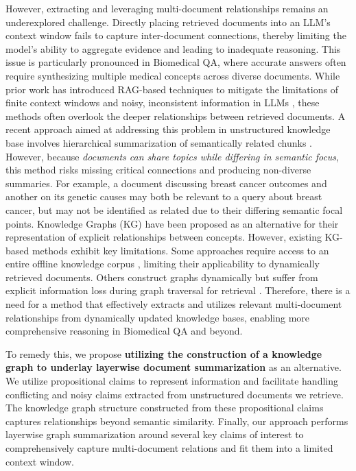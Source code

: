 \documentclass[11pt]{article}
\theoremstyle{definition}
\begin{document}
However, extracting and leveraging multi-document relationships remains an underexplored challenge. Directly placing retrieved documents into an LLM’s context window fails to capture inter-document connections, thereby limiting the model's ability to aggregate evidence and leading to inadequate reasoning. This issue is particularly pronounced in Biomedical QA, where accurate answers often require synthesizing multiple medical concepts across diverse documents. While prior work has introduced RAG-based techniques to mitigate the limitations of finite context windows and noisy, inconsistent information in LLMs \cite{DBLP:journals/corr/abs-2312-10997}, these methods often overlook the deeper relationships between retrieved documents. A recent approach aimed at addressing this problem in unstructured knowledge base involves hierarchical summarization of semantically related chunks \cite{DBLP:conf/iclr/SarthiATKGM24}. However, because \emph{documents can share topics while differing in semantic focus}, this method risks missing critical connections and producing non-diverse summaries. For example, a document discussing breast cancer outcomes and another on its genetic causes may both be relevant to a query about breast cancer, but may not be identified as related due to their differing semantic focal points. Knowledge Graphs (KG) have been proposed as an alternative for their representation of explicit relationships between concepts. However, existing KG-based methods exhibit key limitations. Some approaches require access to an entire offline knowledge corpus \cite{DBLP:journals/corr/abs-2404-16130}, limiting their applicability to dynamically retrieved documents. Others construct graphs dynamically but suffer from explicit information loss during graph traversal for retrieval \cite{DBLP:conf/aaai/0160LRSZD24}. Therefore, there is a need for a method that effectively extracts and utilizes relevant multi-document relationships from dynamically updated knowledge bases, enabling more comprehensive reasoning in Biomedical QA and beyond. 

To remedy this, we propose \textbf{utilizing the construction of a knowledge graph to underlay layerwise document summarization} as an alternative. We utilize propositional claims to represent information and facilitate handling conflicting and noisy claims extracted from unstructured documents we retrieve. The knowledge graph structure constructed from these propositional claims captures relationships beyond semantic similarity. Finally, our approach performs layerwise graph summarization around several key claims of interest to comprehensively capture multi-document relations and fit them into a limited context window.
\end{document}
